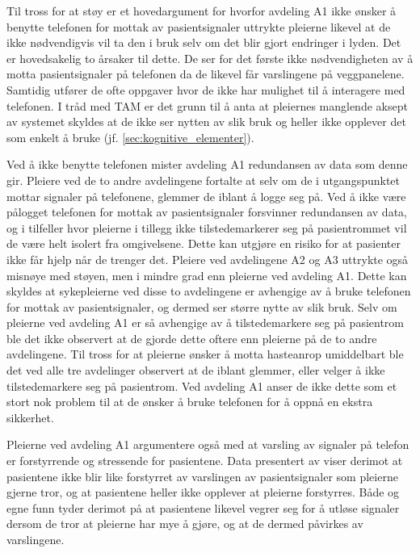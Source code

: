 \noindent 
Til tross for at støy er et hovedargument for hvorfor avdeling A1 ikke ønsker å benytte telefonen for mottak av pasientsignaler uttrykte pleierne likevel at de ikke nødvendigvis vil ta den i bruk selv om det blir gjort endringer i lyden. Det er hovedsakelig to årsaker til dette. De ser for det første ikke nødvendigheten av å motta pasientsignaler på telefonen da de likevel får varslingene på veggpanelene. Samtidig utfører de ofte oppgaver hvor de ikke har mulighet til å interagere med telefonen. I tråd med TAM er det grunn til å anta at pleiernes manglende aksept av systemet skyldes at de ikke ser nytten av slik bruk og heller ikke opplever det som enkelt å bruke (jf. \ref{sec:kognitive_elementer}).

\noindent
Ved å ikke benytte telefonen mister avdeling A1 redundansen av data som denne gir.
Pleiere ved de to andre avdelingene fortalte at selv om de i utgangspunktet mottar signaler på telefonene, glemmer de iblant å logge seg på. Ved å ikke være pålogget telefonen for mottak av pasientsignaler forsvinner redundansen av data, og i tilfeller hvor pleierne i tillegg ikke tilstedemarkerer seg på pasientrommet vil de være helt isolert fra omgivelsene. Dette kan utgjøre en risiko for at pasienter ikke får hjelp når de trenger det. Pleiere ved avdelingene A2 og A3 uttrykte også misnøye med støyen, men i mindre grad enn pleierne ved avdeling A1. Dette kan skyldes at sykepleierne ved disse to avdelingene er avhengige av å bruke telefonen for mottak av pasientsignaler, og dermed ser større nytte av slik bruk. Selv om pleierne ved avdeling A1 er så avhengige av å tilstedemarkere seg på pasientrom ble det ikke observert at de gjorde dette oftere enn pleierne på de to andre avdelingene. Til tross for at pleierne ønsker å motta hasteanrop umiddelbart ble det ved alle tre avdelinger observert at de iblant glemmer, eller velger å ikke tilstedemarkere seg på pasientrom. Ved avdeling A1 anser de ikke dette som et stort nok problem til at de ønsker å bruke telefonen for å oppnå en ekstra sikkerhet. 

\noindent
Pleierne ved avdeling A1 argumentere også med at varsling av signaler på telefon er forstyrrende og stressende for pasientene. Data presentert av \citet{Rygh13} viser derimot at pasientene ikke blir like forstyrret av varslingen av pasientsignaler som pleierne gjerne tror, og at pasientene heller ikke opplever at pleierne forstyrres. Både \citet{Rygh13} og egne funn tyder derimot på at pasientene likevel vegrer seg for å utløse signaler dersom de tror at pleierne har mye å gjøre, og at de dermed påvirkes av varslingene.

